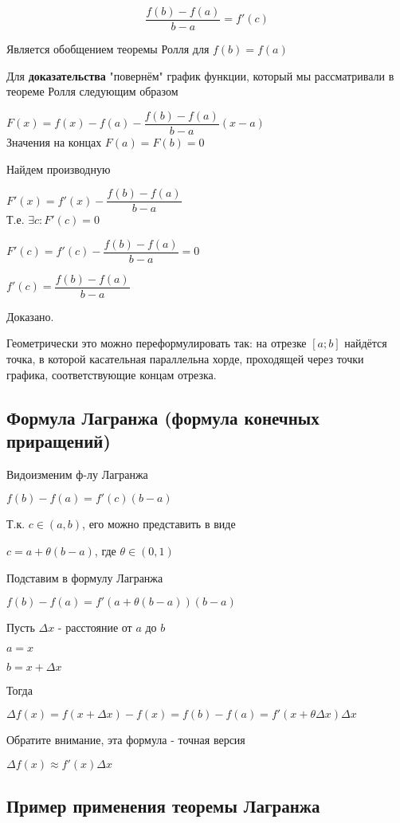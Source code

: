$$
\frac{f(b)-f(a)}{b-a}=f'(c)
$$

Является обобщением теоремы Ролля для $ f(b) = f(a) $

Для \textbf{доказательства} "повернём" график функции, который мы рассматривали в теореме Ролля следующим образом

$ F(x) = f(x) - f(a) - \dfrac{f(b)-f(a)}{b-a} (x-a) $ \\

Значения на концах $ F(a) = F(b) = 0 $

Найдем производную 

$ F'(x) = f'(x) - \dfrac{f(b)-f(a)}{b-a} $ \\

Т.е. $ \exists c: F'(c) = 0 $

$ F'(c) = f'(c) - \dfrac{f(b)-f(a)}{b-a} = 0  $

$ f'(c) = \dfrac{f(b)-f(a)}{b-a} $

Доказано.

Геометрически это можно переформулировать так: на отрезке $[a;b]$ найдётся точка, в которой касательная параллельна хорде, проходящей через точки графика, соответствующие концам отрезка.

\subsection{Формула Лагранжа (формула конечных приращений)}

Видоизменим ф-лу Лагранжа

$ f(b)-f(a) = f'(c)(b-a) $

Т.к. $ c \in (a,b) $, его можно представить в виде

$ c = a + \theta(b-a) $, где $ \theta \in (0,1) $

Подставим в формулу Лагранжа

$ f(b)-f(a) = f'(a + \theta(b-a))(b-a) $

Пусть $ \Delta x $ - расстояние от $ a $ до $ b $

$ a = x $

$b = x + \Delta x $

Тогда 

$ \Delta f(x) = f(x + \Delta x) - f(x) = f(b)-f(a) = f'(x + \theta \Delta x) \Delta x $

Обратите внимание, эта формула - точная версия

$ \Delta f(x) \approx f'(x) \Delta x $

\subsection{Пример применения теоремы Лагранжа}

